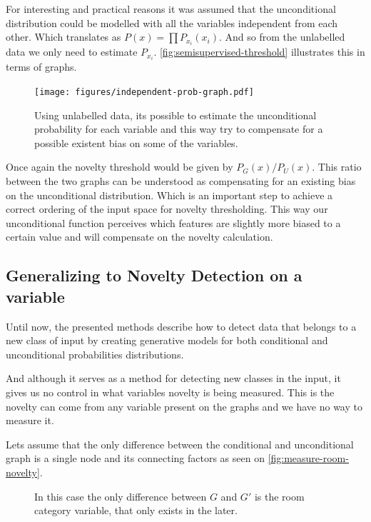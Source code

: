\documentclass[runningheads,a4paper]{llncs}
\begin{document}
For interesting and practical reasons it was assumed that the unconditional distribution
could be modelled with all the variables independent from each other.
Which translates as $P(x)=\prod{P_{x_i}(x_i)}$.
And so from the unlabelled data we only need to estimate $P_{x_i}$.
\autoref{fig:semisupervised-threshold} illustrates this in terms of graphs.

\begin{figure}[h]
\centering
\texttt{[image: figures/independent-prob-graph.pdf]}
\caption{\label{fig:semisupervised-threshold}Using unlabelled data, its possible to estimate
         the unconditional probability for each variable and this way try to compensate
         for a possible existent bias on some of the variables.}
\end{figure}

Once again the novelty threshold would be given by $P_G(x)/P_U(x)$. This ratio between the two graphs
can be understood as compensating for an existing bias on the unconditional distribution.
Which is an important step to achieve a correct ordering of the input space for novelty thresholding.
This way our unconditional function perceives which features are slightly more biased to a certain value
and will compensate on the novelty calculation.

\subsection{Generalizing to Novelty Detection on a variable}
Until now, the presented methods describe how to detect data that belongs to a new class of input by creating
generative models for both conditional and unconditional probabilities distributions.

And although it serves as a method for detecting new classes in the input, it gives us no control in what
variables novelty is being measured.
This is the novelty can come from any variable present on the graphs and we have no way to measure it.

Lets assume that the only difference between the conditional and unconditional graph is a single node and its connecting factors
as seen on \autoref{fig:measure-room-novelty}.

\begin{figure}
\caption{\label{fig:measure-room-novelty}In this case the only difference between $G$ and $G'$ is the room category variable,
         that only exists in the later.}
\end{figure}
\end{document}
